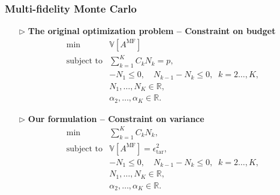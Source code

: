 \documentclass{beamer}
\begin{document}
\begin{frame}[t]
    \frametitle{Multi-fidelity Monte Carlo}
    \begin{itemize}[leftmargin=5pt] 
     \vspace{3mm}
        \item[$\triangleright$] \textcolor{myblue3}{\bf The original optimization problem -- Constraint on budget}
        {\footnotesize
        \begin{equation*}\label{eq:Optimization_pb_sample_size}
            \begin{array}{ll}
            \min &\mathbb{V}\left[A^{\text{MF}}\right]\\
               \text{subject to} &\displaystyle\sum\limits_{k=1}^K C_kN_k=p,\\[2pt]
               &\displaystyle -N_1\le 0,\quad \displaystyle N_{k-1}-N_k\le 0, \;\; k=2\ldots,K,\\
               &N_1,\ldots, N_K\in \mathbb{R},\\
               &\alpha_2,\ldots,\alpha_K\in \mathbb{R}.
            \end{array}
        \end{equation*}
        }

        \item[$\triangleright$] \textcolor{myblue3}{\bf  Our formulation -- Constraint on variance}
        {\footnotesize
        \begin{equation*}\label{eq:Optimization_pb_sample_size}
            \begin{array}{ll}
            \min &\sum\limits_{k=1}^K C_kN_k,\\
            \text{subject to} &\displaystyle\mathbb{V}\left[A^{\text{MF}}\right]=\epsilon_{\text{tar}}^2,\\[2pt]
               &\displaystyle -N_1\le 0,\quad \displaystyle N_{k-1}-N_k\le 0, \;\; k=2\ldots,K,\\
               &N_1,\ldots, N_K\in \mathbb{R},\\
               &\alpha_2,\ldots,\alpha_K\in \mathbb{R}.
            \end{array}
        \end{equation*}
        }
        
    \end{itemize}
\end{frame}
\end{document}
